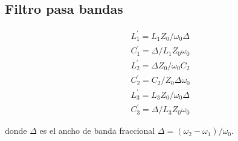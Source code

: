\subsection*{Filtro pasa bandas}
\begin{subequations}
    \begin{align}
        & L_{1}^{'} = L_{1} Z_{0} / \omega_{0} \Delta \\
        & C_{1}^{'} = \Delta / L_{1} Z_{0} \omega_{0} \\
        & L_{2}^{'} = \Delta Z_{0} / \omega_{0} C_{2} \\
        & C_{2}^{'} = C_{2} / Z_{0} \Delta \omega_{0} \\
        & L_{3}^{'} = L_{3} Z_{0} / \omega_{0} \Delta \\
        & C_{3}^{'} = \Delta / L_{3} Z_{0}  \omega_{0}
    \end{align}
\end{subequations}

donde $\Delta$ es el ancho de banda fraccional $\Delta = (\omega_{2} - \omega_{1}) / \omega_{0}$. \\

